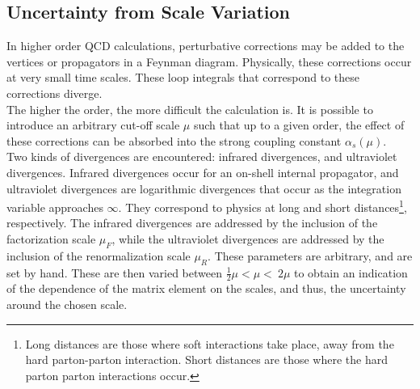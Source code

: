 \documentclass[11pt,a4paper,final]{report}
\begin{document}
\subsection{Uncertainty from Scale Variation}
In higher order QCD calculations, perturbative corrections may be added to the vertices or propagators in a Feynman diagram. Physically, these corrections occur at very small time scales. These loop integrals that correspond to these corrections diverge.\\
The higher the order, the more difficult the calculation is. It is possible to introduce an arbitrary cut-off scale $\mu$ such that up to a given order, the effect of these corrections can be absorbed into the strong coupling constant $\alpha_s(\mu)$.\\
Two kinds of divergences are encountered: infrared divergences, and ultraviolet divergences. Infrared divergences occur for an on-shell internal propagator, and ultraviolet divergences are logarithmic divergences that occur as the integration variable approaches $\infty$. They correspond to physics at long and short distances\footnote{Long distances are those where soft interactions take place, away from the hard parton-parton interaction. Short distances are those where the hard parton parton interactions occur.}, respectively. The infrared divergences are addressed by the inclusion of the factorization scale $\mu_F$, while the ultraviolet divergences are addressed by the inclusion of the renormalization scale $\mu_R$. These parameters are arbitrary, and are set by hand. These are then varied between $\frac{1}{2}\mu < \mu < \ 2\mu$ to obtain an indication of the dependence of the matrix element on the scales, and thus, the uncertainty around the chosen scale. 
\end{document}
